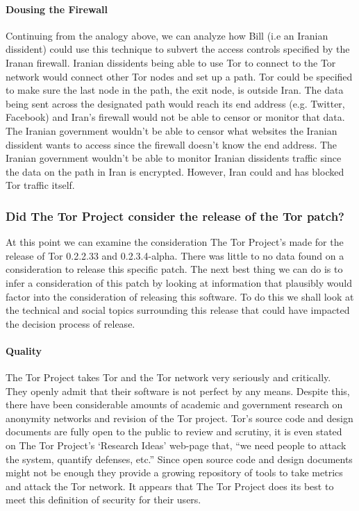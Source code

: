 \documentclass[11pt]{article}
\begin{document}
\begin{multicols}{2}
\paragraph{Dousing the Firewall}

Continuing from the analogy above, we can analyze how Bill (i.e an Iranian
dissident) could use this technique to subvert the access controls specified by
the Iranan firewall. Iranian dissidents being able to use Tor to connect to the
Tor network would connect other Tor nodes and set up a path. Tor could be
specified to make sure the last node in the path, the exit node, is outside Iran.\cite{
Tor:SpecificExitNode, Tor:FAQ} The data being sent across the designated
path would reach its end address (e.g.  Twitter, Facebook) and Iran's firewall
would not be able to censor or monitor that data. The Iranian government
wouldn't be able to censor what websites the Iranian dissident wants to access
since the firewall doesn't know the end address. The Iranian government wouldn't
be able to monitor Iranian dissidents traffic since the data on the path in Iran
is encrypted. However, Iran could and has blocked Tor traffic
itself.

\subsubsection{Did The Tor Project consider the release of the Tor patch?} 

At this point we can examine the consideration The Tor Project's made for the
release of Tor 0.2.2.33 and 0.2.3.4-alpha. There was little to no data found on
a consideration to release this specific patch. The next best thing we
can do is to infer a consideration of this patch by looking at information that
plausibly would factor into the consideration of releasing this software. To do
this we shall look at the technical and social topics surrounding this release
that could have impacted the decision process of release.

\paragraph{Quality}

The Tor Project takes Tor and the Tor network very seriously and critically.
They openly admit that their software is not perfect by any means. Despite this,
there have been considerable amounts of academic and government research on
anonymity networks and revision of the Tor project.\cite{Tor:ResearchPapers}
Tor's source code and design documents are fully open to the public to review
and scrutiny, it is even stated on The Tor Project's `Research Ideas'
web-page that, ``we need people to attack the system, quantify defenses, etc.''\cite{
Tor:ResearchIdeas, Tor:2011} Since open source code and design documents
might not be enough  they provide a growing repository of tools to take metrics
and attack the Tor network.\cite{Tor:ResearchHome}
It appears that The Tor Project does its best to meet this definition of
security for their users.  


\end{multicols}
\end{document}
